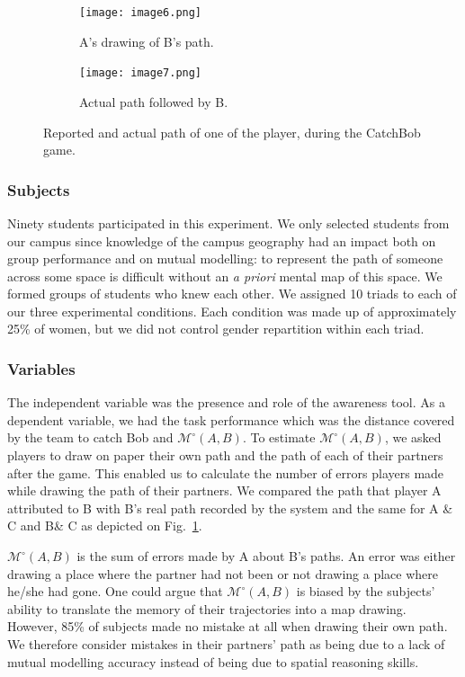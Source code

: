 \documentclass[natbib]{svjour3}
\newcommand{\A}{A\xspace}
\newcommand{\B}{B\xspace}
\newcommand{\C}{C\xspace}
\newcommand{\gModel}[2]{{$\mathcal{M}^{\circ}(#1, #2)$}}
\begin{document}
\begin{figure}[h!t] \centering \begin{subfigure}{.45\textwidth}
\texttt{[image: image6.png]} \caption{A's drawing of \B's
path.} \end{subfigure} \begin{subfigure}{.4\textwidth}
\texttt{[image: image7.png]} \caption{Actual path followed by
\B.} \end{subfigure} \caption{Reported and actual path of one of the player,
during the {\sc CatchBob} game.} \label{study2:paths} \end{figure}

\subsubsection*{Subjects}


Ninety students participated in this experiment. We only selected students from
our campus since knowledge of the campus geography had an impact both on group
performance and on mutual modelling: to represent the path of someone across
some space is difficult without an \textit{a priori} mental map of this space.
We formed groups of students who knew each other. We assigned 10 triads to each
of our three experimental conditions. Each condition was made up of
approximately 25\% of women, but we did not control gender repartition within
each triad.

\subsubsection*{Variables}

The independent variable was the presence and role of the awareness tool. As a
dependent variable, we had the task performance which was the distance covered
by the team to catch Bob and \gModel{A}{B}. To estimate \gModel{A}{B}, we asked
players to draw on paper their own path and the path of each of their partners
after the game. This enabled us to calculate the number of errors players made
while drawing the path of their partners. We compared the path that player \A
attributed to \B with \B's real path recorded by the system and the same for \A
\& \C and \B \& \C as depicted on Fig.~\ref{study2:paths}. 

\gModel{A}{B} is the sum of errors made by \A about \B's paths. An error was
either drawing a place where the partner had not been or not drawing a place
where he/she had gone. One could argue that \gModel{A}{B} is biased by the
subjects' ability to translate the memory of their trajectories into a map drawing.
However, 85\% of subjects made no mistake at all when drawing their own path.
We therefore consider mistakes in their partners' path as being due to a lack
of mutual modelling accuracy instead of being due to spatial reasoning skills.
\end{document}
